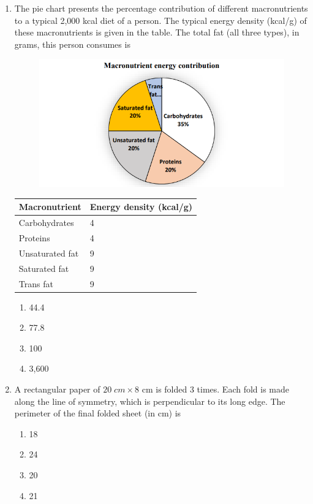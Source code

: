 \documentclass[journal]{IEEEtran}
\theoremstyle{remark}
\begin{document}
\begin{enumerate}[resume]
\item The pie chart presents the percentage contribution of different macronutrients to a typical 2,000 kcal diet of a person. The typical energy density (kcal/g) of these macronutrients is given in the table. The total fat (all three types), in grams, this person consumes is \hfill{}
\begin{figure}[H]
    \centering
    \includegraphics[width=0.6\columnwidth]{figs/Q.8.png}
    \caption{}
    \label{fig:placeholder}
\end{figure}
\begin{center}
\begin{tabular}{|l|l|}
\hline
\textbf{Macronutrient} & \textbf{Energy density (kcal/g)} \\
\hline
Carbohydrates & 4 \\
Proteins & 4 \\
Unsaturated fat & 9 \\
Saturated fat & 9 \\
Trans fat & 9 \\
\hline
\end{tabular}
\end{center}
\begin{multicols}{4}
\begin{enumerate}
\item 44.4
\item 77.8
\item 100
\item 3,600
\end{enumerate}
\end{multicols}

\item A rectangular paper of $20\;cm \times 8$ cm is folded 3 times. Each fold is made along the line of symmetry, which is perpendicular to its long edge. The perimeter of the final folded sheet (in cm) is \hfill{}
\begin{multicols}{4}
\begin{enumerate}
\item 18
\item 24
\item 20
\item 21
\end{enumerate}
\end{multicols}


\end{enumerate}
\end{document}

